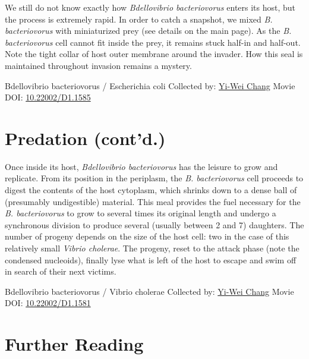 \documentclass[]{tufte-book}
\begin{document}
We still do not know exactly how \emph{Bdellovibrio bacteriovorus} enters its host, but the process is extremely rapid. In order to catch a snapshot, we mixed \emph{B. bacteriovorus} with miniaturized prey (see details on the main page). As the \emph{B. bacteriovorus} cell cannot fit inside the prey, it remains stuck half-in and half-out. Note the tight collar of host outer membrane around the invader. How this seal is maintained throughout invasion remains a mystery.



\hypertarget{htmlwidget-e099a5e465018d50100f}{}

\label{fig:9-10a}Bdellovibrio bacteriovorus / Escherichia coli Collected by: \protect\hyperlink{yi-wei_chang}{Yi-Wei Chang} Movie DOI: \href{https://doi.org/10.22002/D1.1585}{10.22002/D1.1585}

\hypertarget{predation-contd.-1}{%
\section{Predation (cont'd.)}\label{predation-contd.-1}}

Once inside its host, \emph{Bdellovibrio bacteriovorus} has the leisure to grow and replicate. From its position in the periplasm, the \emph{B. bacteriovorus} cell proceeds to digest the contents of the host cytoplasm, which shrinks down to a dense ball of (presumably undigestible) material. This meal provides the fuel necessary for the \emph{B. bacteriovorus} to grow to several times its original length and undergo a synchronous division to produce several (usually between 2 and 7) daughters. The number of progeny depends on the size of the host cell: two in the case of this relatively small \emph{Vibrio cholerae}. The progeny, reset to the attack phase (note the condensed nucleoids), finally lyse what is left of the host to escape and swim off in search of their next victims.



\hypertarget{htmlwidget-8802485c0969de6957b9}{}

\label{fig:9-11}Bdellovibrio bacteriovorus / Vibrio cholerae Collected by: \protect\hyperlink{yi-wei_chang}{Yi-Wei Chang} Movie DOI: \href{https://doi.org/10.22002/D1.1581}{10.22002/D1.1581}

\hypertarget{further-reading-8}{%
\section{Further Reading}\label{further-reading-8}}
\end{document}
